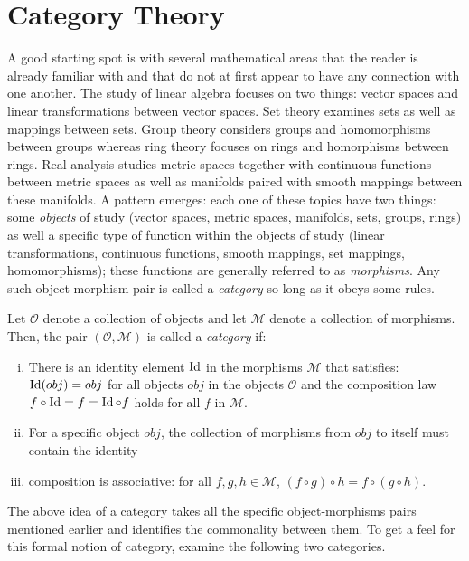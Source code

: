 \documentclass[../sean_thesis.tex]{subfiles}
\begin{document}
\chapter{Category Theory}

A good starting spot is with several mathematical areas that the reader is already familiar with and that do not at first appear to have any connection with one another. 
The study of linear algebra focuses on two things: vector spaces and linear transformations between vector spaces. Set theory examines sets as well as mappings between sets. Group theory considers groups and homomorphisms between groups whereas ring theory focuses on rings and homorphisms between rings. Real analysis studies metric spaces together with continuous functions between metric spaces as well as manifolds paired with smooth mappings between these manifolds. A pattern emerges: each one of these topics have two things: some \emph{objects} of study (vector spaces, metric spaces, manifolds, sets, groups, rings) as well a specific type of function within the objects of study (linear transformations, continuous functions, smooth mappings, set mappings, homomorphisms); these functions are generally referred to as \emph{morphisms}. Any such object-morphism pair is called a \emph{category} so long as it obeys some rules.

\begin{definition}[Category]
	Let $\mathcal{O}$ denote a collection of objects and let $\mathcal{M}$ denote a collection of morphisms. Then, the pair $(\mathcal{O}, \mathcal{M})$ is called a \emph{category} if:
	\vspace{-\varparskip}
	\begin{enumerate}[(i)]
		\item There is an identity element $\operatorname{Id}$ in the morphisms $\mathcal{M}$ that satisfies: $\operatorname{Id}(obj) = obj$ for all objects $obj$ in the objects $\mathcal{O}$ and the composition law $f \circ \operatorname{Id} = f = \operatorname{Id} \circ f$ holds for all $f$ in $\mathcal{M}$.
		\item For a specific object $obj$, the collection of morphisms from $obj$ to itself must contain the identity
		\item composition is associative: for all $f,g,h \in \mathcal{M}$,  $(f \circ g) \circ h = f \circ (g \circ h)$.
	\end{enumerate}
	\vspace{-\varparskip}
\end{definition}

The above idea of a category takes all the specific object-morphisms pairs mentioned earlier and identifies the commonality between them. To get a feel for this formal notion of category, examine the following two categories.
\end{document}
